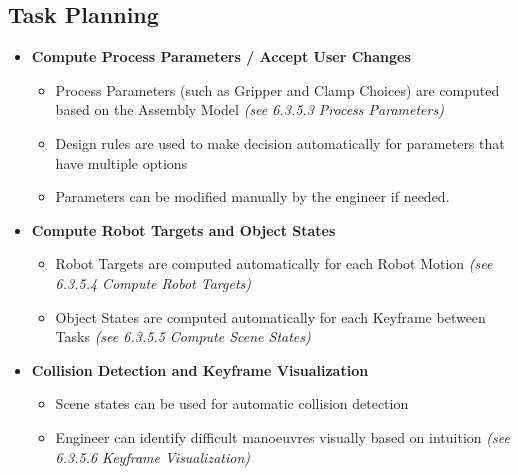 \documentclass[11pt]{book}
\begin{document}
\subsection{Task Planning}

\begin{itemize}
\begin{itemize}
	\item A sequential list of High Level Assembly Tasks is computed using a flowchart method \textit{\textcolor[HTML]{B7B7B7}{(see 6.3.5.1 Task Planning with Flowchart)}}

	\item This list is expanded to a more comprehensive list of Low Level Tasks \textit{\textcolor[HTML]{B7B7B7}{(see 6.3.5.2 Expansion to Low Level Tasks)}}

\end{itemize}
	\item \textbf{Compute Process Parameters / Accept User Changes}

\begin{itemize}
	\item Process Parameters (such as Gripper and Clamp Choices) are computed based on the Assembly Model \textit{\textcolor[HTML]{B7B7B7}{(see 6.3.5.3 Process Parameters)}}

	\item Design rules are used to make decision automatically for parameters that have multiple options

	\item Parameters can be modified manually by the engineer if needed.

\end{itemize}
	\item \textbf{Compute Robot Targets and Object States}

\begin{itemize}
	\item Robot Targets are computed automatically for each Robot Motion \textit{\textcolor[HTML]{B7B7B7}{(see 6.3.5.4 Compute Robot Targets)}}

	\item Object States are computed automatically for each Keyframe between Tasks \textit{\textcolor[HTML]{B7B7B7}{(see 6.3.5.5 Compute Scene States)}}

\end{itemize}
	\item \textbf{Collision Detection and Keyframe Visualization}

\begin{itemize}
	\item Scene states can be used for automatic collision detection

	\item Engineer can identify difficult manoeuvres visually based on intuition \textit{\textcolor[HTML]{B7B7B7}{(see 6.3.5.6 Keyframe Visualization)}}

\end{itemize}
\end{itemize}
\end{document}
